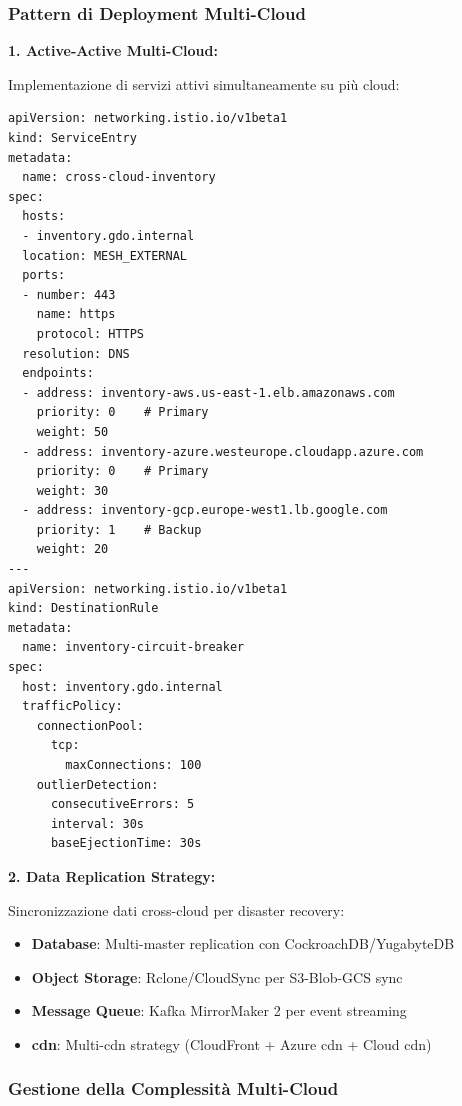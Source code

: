 \subsubsection{\texorpdfstring{Pattern di Deployment Multi-Cloud}{3.4.2.2 - Pattern di Deployment Multi-Cloud}}

\textbf{1. Active-Active Multi-Cloud:}

Implementazione di servizi attivi simultaneamente su più cloud:

\begin{lstlisting}[caption={\gls{kubernetes} Multi-Cloud Service},label={lst:multicloud_k8s}]
apiVersion: networking.istio.io/v1beta1
kind: ServiceEntry
metadata:
  name: cross-cloud-inventory
spec:
  hosts:
  - inventory.gdo.internal
  location: MESH_EXTERNAL
  ports:
  - number: 443
    name: https
    protocol: HTTPS
  resolution: DNS
  endpoints:
  - address: inventory-aws.us-east-1.elb.amazonaws.com
    priority: 0    # Primary
    weight: 50
  - address: inventory-azure.westeurope.cloudapp.azure.com
    priority: 0    # Primary
    weight: 30
  - address: inventory-gcp.europe-west1.lb.google.com
    priority: 1    # Backup
    weight: 20
---
apiVersion: networking.istio.io/v1beta1
kind: DestinationRule
metadata:
  name: inventory-circuit-breaker
spec:
  host: inventory.gdo.internal
  trafficPolicy:
    connectionPool:
      tcp:
        maxConnections: 100
    outlierDetection:
      consecutiveErrors: 5
      interval: 30s
      baseEjectionTime: 30s
\end{lstlisting}

\textbf{2. Data Replication Strategy:}

Sincronizzazione dati cross-cloud per disaster recovery:

\begin{itemize}
    \item \textbf{Database}: Multi-master replication con CockroachDB/YugabyteDB
    \item \textbf{Object Storage}: Rclone/CloudSync per S3-Blob-GCS sync
    \item \textbf{Message Queue}: Kafka MirrorMaker 2 per event streaming
    \item \textbf{\gls{cdn}}: Multi-\gls{cdn} strategy (CloudFront + Azure \gls{cdn} + Cloud \gls{cdn})
\end{itemize}

\subsubsection{\texorpdfstring{Gestione della Complessità Multi-Cloud}{3.4.2.3 - Gestione della Complessità Multi-Cloud}}

